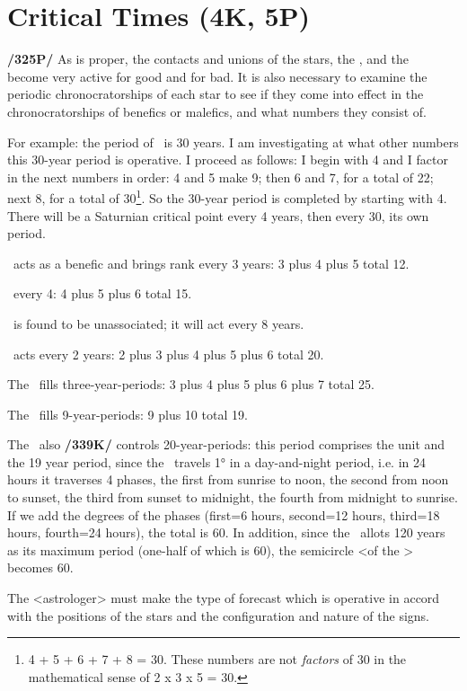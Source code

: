 \section{Critical Times (4K, 5P)}

\textbf{/325P/} As is proper, the contacts and unions of the stars, the \Sun, and the \Moon\, become very active for good and for bad. It is also necessary to examine the periodic chronocratorships of each star to see if they come into effect in the chronocratorships of benefics or malefics, and what numbers they consist of. 

For example: the period of \Saturn\, is 30 years. I am investigating at what other numbers this 30-year period is operative. I proceed as follows: I begin with 4 and I factor in the next numbers in order: 4 and 5 make 9; then 6 and 7, for a total of 22; next 8, for a total of 30\footnote{4 + 5 + 6 + 7 + 8 = 30. These numbers are not \textsl{factors} of 30 in the mathematical sense of 2 x 3 x 5 = 30.}. So the 30-year period is completed by starting with 4. There will be a Saturnian critical point every 4 years, then every 30, its own period.

\Jupiter\, acts as a benefic and brings rank every 3 years: 3 plus 4 plus 5 total 12.

\Mars\, every 4: 4 plus 5 plus 6 total 15.

\Venus\, is found to be unassociated; it will act every 8 years.

\Mercury\, acts every 2 years: 2 plus 3 plus 4 plus 5 plus 6 total 20.

The \Moon\, fills three-year-periods: 3 plus 4 plus 5 plus 6 plus 7 total 25.

The \Sun\, fills 9-year-periods: 9 plus 10 total 19. 

The \Sun\, also \textbf{/339K/} controls 20-year-periods: this period comprises the unit and the 19 year period, since the \Sun\, travels 1° in a day-and-night period, i.e. in 24 hours it traverses 4 phases, the first from sunrise to noon, the second from noon to sunset, the third from sunset to midnight, the fourth from midnight to sunrise. If we add the degrees of the phases (first=6 hours, second=12 hours, third=18 hours, fourth=24 hours), the total is 60. In addition, since the \Sun\, allots 120 years as its maximum period (one-half of which is 60), the semicircle <of the \Sun> becomes 60. 

The <astrologer> must make the type of forecast which is operative in accord with the positions of the stars and the configuration and nature of the signs.

\newpage